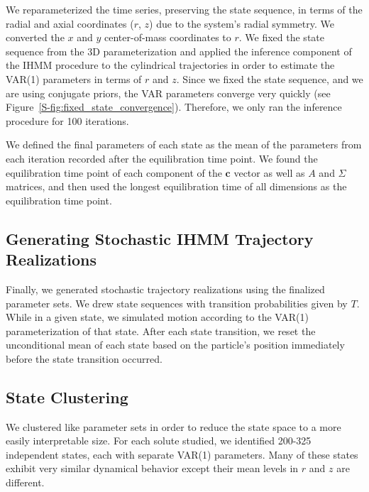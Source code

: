 \documentclass[journal=jpcbfk,manuscript=article]{achemso}
\begin{document}
  We reparameterized the time series, preserving the state sequence, in terms
  of the radial and axial coordinates ($r$, $z$) due to the system's radial 
  symmetry. We converted the $x$ and $y$ center-of-mass coordinates to $r$. 
  We fixed the state sequence from the 3D parameterization and applied the 
  inference component of the IHMM procedure to the cylindrical trajectories 
  in order to estimate the VAR(1) parameters in terms of $r$ and $z$. Since
  we fixed the state sequence, and we are using conjugate priors, the VAR 
  parameters converge very quickly (see Figure~\ref{S-fig:fixed_state_convergence}).
  Therefore, we only ran the inference procedure for 100 iterations. 
  
  We defined the final parameters of each state as the mean of the parameters 
  from each iteration recorded after the equilibration time point. We found the 
  equilibration time point of each component of the $\mathbf{c}$ vector as well as 
  $A$ and $\Sigma$ matrices, and then used the longest equilibration time of all 
  dimensions as the equilibration time point. 
  
  \subsection{Generating Stochastic IHMM Trajectory Realizations}\label{method:realizations}
  
  Finally, we generated stochastic trajectory realizations using the finalized
  parameter sets. We drew state sequences with transition probabilities given by
  $T$. While in a given state, we simulated motion according to the VAR(1)
  parameterization of that state. After each state transition, we reset the 
  unconditional mean of each state based on the particle's position immediately
  before the state transition occurred.
  
  \subsection{State Clustering}\label{method:clustering}  

  We clustered like parameter sets in order to reduce the state space to
  a more easily interpretable size. For each solute studied, we identified 200-325
  independent states, each with separate VAR(1) parameters. Many of these states
  exhibit very similar dynamical behavior except their mean levels in $r$ and $z$
  are different.
  
\end{document}
